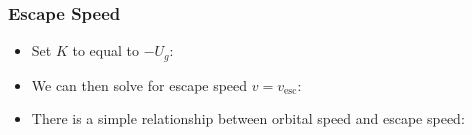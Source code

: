 \documentclass[12pt,compress,aspectratio=169]{beamer}
\begin{document}
\begin{frame}
  \frametitle{Escape Speed}
  \begin{itemize}
  \item Set $K$ to equal to $-U_g$:
    
  \item We can then solve for escape speed $v=v_\mathrm{esc}$:


  \item There is a simple relationship between orbital speed and escape
    speed:

  \end{itemize}
\end{frame}
\end{document}
